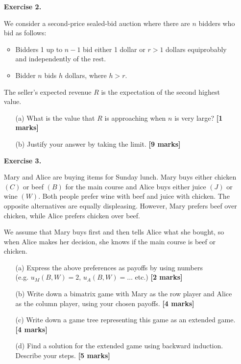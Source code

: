 \documentclass{article}
\begin{document}
\begin{enumerate}
	\item[\textbf{Exercise 2.}]  %

	      We consider a second-price sealed-bid auction where there are $n$ bidders who bid as follows:
	      \begin{itemize}
		      \item Bidders 1 up to $n-1$ bid either 1 dollar or $r > 1$ dollars equiprobably and
		            independently of the rest.
		      \item Bidder $n$ bids $h$ dollars, where $h > r$.
	      \end{itemize}
	      The seller's expected revenue $R$ is the expectation of the second highest value.
	      \begin{itemize}
		      \item[(a)] What is the value that $R$ is approaching when $n$ is very large? \hfill{\bf [1 marks]}\smallskip
		      \item[(b)] Justify your answer by taking the limit. \hfill{\bf [9 marks]}\smallskip
	      \end{itemize}

	      \newpage




	\item[\textbf{Exercise 3.}]   %

	      Mary and Alice are buying items for Sunday lunch. Mary buys either chicken $(C)$ or beef $(B)$ for the main course and Alice buys either juice $(J)$
	      or wine $(W)$. Both people prefer wine with beef and juice with chicken. The opposite alternatives are equally displeasing.
	      However, Mary prefers beef over chicken, while Alice prefers chicken over beef.

	      We assume that Mary buys first and then tells Alice what she bought,
	      so when Alice makes her decision, she knows if the main course is beef or chicken.

	      \begin{enumerate}
		      \item[(a)] Express the above preferences as payoffs by using numbers\\(e.g.
		            $u_M(B,W) = 2$, $u_A(B,W) = \ldots$  etc.)               \hfill{\bf [2 marks]}\smallskip
		      \item[(b)] Write down a bimatrix game with Mary as the row player
		            and Alice as the column player, using your chosen payoffs.           \hfill{\bf [4 marks]}\smallskip
		      \item[(c)] Write down a game tree representing this game as an extended game.  \hfill{\bf [4 marks]}\smallskip
		      \item[(d)] Find a solution for the extended game using backward induction.\\Describe your steps.  \hfill{\bf [5 marks]}\smallskip
	      \end{enumerate}
	      \vspace*{0.8cm}




\end{enumerate}
\end{document}
